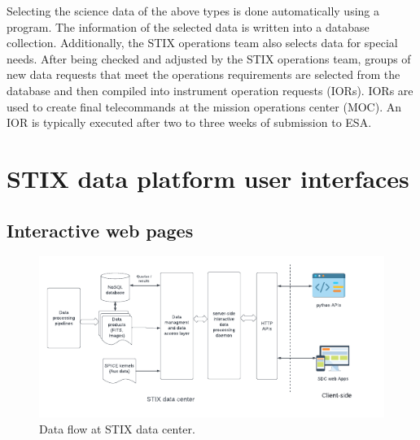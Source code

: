 \documentclass[referee]{aa} %
\begin{document}
Selecting the science data of the above types is done automatically using a program. The information of the selected data is written into a database collection.  Additionally, the STIX operations team also selects data for special 
needs.  After being checked and adjusted by the STIX operations team, groups of new data requests that meet the operations requirements are selected from the database and then compiled into instrument operation requests (IORs). 
IORs are used to create final telecommands at the mission operations center (MOC). An IOR is typically executed after two to three weeks of submission to ESA. 

\section{STIX data platform user interfaces}
\subsection{Interactive web pages}
\begin{figure}[h]
  \centering
  \includegraphics[width=0.9\linewidth]{figures/interfaces.pdf}
  \caption{ 
    Data flow at STIX data center.
  }
  \label{fig:interfaces}
\end{figure}
\end{document}
